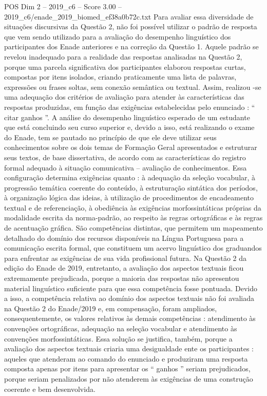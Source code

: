 \begin{textsample}{POS Dim 2 – 2019\_c6 – Score 3.00 – 2019\_c6/enade\_2019\_biomed\_ef38a0b72c.txt}
Para avaliar essa diversidade de situações discursivas da Questão 2, não foi possível utilizar o padrão de resposta que vem sendo utilizado para a avaliação do desempenho linguístico dos participantes dos Enade anteriores e na correção da Questão 1.
Aquele padrão se revelou inadequado para a realidade das respostas analisadas na Questão 2, porque uma parcela significativa dos participantes elaborou respostas curtas, compostas por itens isolados, criando praticamente uma lista de palavras, expressões ou frases soltas, sem conexão semântica ou textual.
Assim, realizou -se uma adequação dos critérios de avaliação para atender às características das respostas produzidas, em função das exigências estabelecidas pelo enunciado : “ citar ganhos ”.
A análise do desempenho linguístico esperado de um estudante que está concluindo seu curso superior e, devido a isso, está realizando o exame do Enade, tem se pautado no princípio de que ele deve utilizar seus conhecimentos sobre os dois temas de Formação Geral apresentados e estruturar seus textos, de base dissertativa, de acordo com as características do registro formal adequado à situação comunicativa – avaliação de conhecimentos.
Essa configuração determina exigências quanto : à adequação da seleção vocabular, à progressão temática coerente do conteúdo, à estruturação sintática dos períodos, à organização lógica das ideias, à utilização de procedimentos de encadeamento textual e de referenciação, à obediência às exigências morfossintáticas próprias da modalidade escrita da norma-padrão, ao respeito às regras ortográficas e às regras de acentuação gráfica.
São competências distintas, que permitem um mapeamento detalhado do domínio dos recursos disponíveis na Língua Portuguesa para a comunicação escrita formal, que constituem um acervo linguístico dos graduandos para enfrentar as exigências de sua vida profissional futura.
Na Questão 2 da edição do Enade de 2019, entretanto, a avaliação dos aspectos textuais ficou extremamente prejudicada, porque a maioria das respostas não apresentou material linguístico suficiente para que essa competência fosse pontuada.
Devido a isso, a competência relativa ao domínio dos aspectos textuais não foi avaliada na Questão 2 do Enade/2019 e, em compensação, foram ampliados, consequentemente, os valores relativos às demais competências : atendimento às convenções ortográficas, adequação na seleção vocabular e atendimento às convenções morfossintáticas.
Essa solução se justifica, também, porque a avaliação dos aspectos textuais criaria uma desigualdade ente os participantes : aqueles que atenderam ao comando do enunciado e produziram uma resposta composta apenas por itens para apresentar os “ ganhos ” seriam prejudicados, porque seriam penalizados por não atenderem às exigências de uma construção coerente e bem desenvolvida.

\end{textsample}
